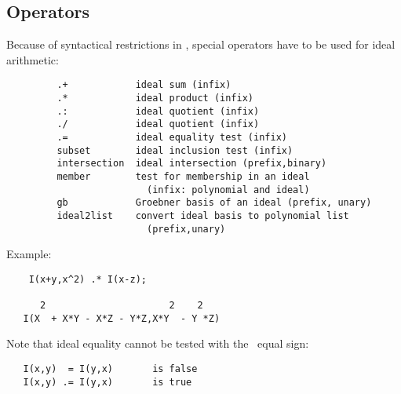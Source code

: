 \subsection{Operators}

Because of syntactical restrictions in \REDUCE, special operators
have to be used for ideal arithmetic:

\begin{verbatim}
         .+            ideal sum (infix)
         .*            ideal product (infix)
         .:            ideal quotient (infix)
         ./            ideal quotient (infix)
         .=            ideal equality test (infix)
         subset        ideal inclusion test (infix)
         intersection  ideal intersection (prefix,binary)
         member        test for membership in an ideal
                         (infix: polynomial and ideal)
         gb            Groebner basis of an ideal (prefix, unary)
         ideal2list    convert ideal basis to polynomial list
                         (prefix,unary)
\end{verbatim}

Example:

\begin{verbatim}
    I(x+y,x^2) .* I(x-z);

      2                      2    2
   I(X  + X*Y - X*Z - Y*Z,X*Y  - Y *Z)
\end{verbatim}

Note that ideal equality cannot be tested with the \REDUCE\ equal sign:
\begin{verbatim}
   I(x,y)  = I(y,x)       is false
   I(x,y) .= I(y,x)       is true
\end{verbatim}

